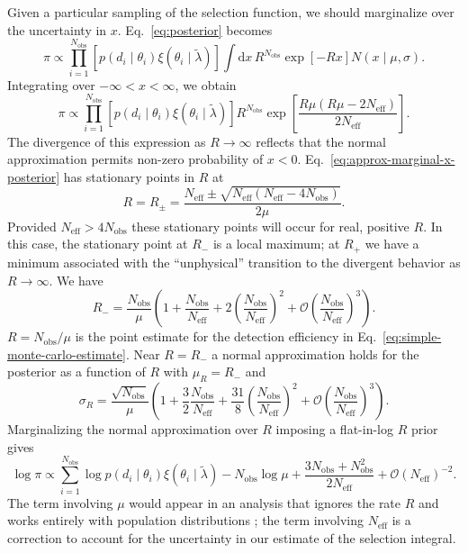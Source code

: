 \documentclass[modern]{aastex62}
\newcommand{\dd}{\mathrm{d}}
\newcommand{\Neff}{N_\mathrm{eff}}
\newcommand{\Nobs}{N_\mathrm{obs}}
\begin{document}
Given a particular sampling of the selection function, we should marginalize
over the uncertainty in $x$.  Eq.\ \eqref{eq:posterior} becomes
%
\begin{equation}
  \label{eq:posterior-integrated}
    \pi \propto \prod_{i = 1}^{\Nobs} \left[ p\left( d_i \mid \theta_i \right) \xi\left( \theta_i \mid \tilde{\lambda} \right) \right] \int \dd x \, R^{\Nobs} \exp\left[ -R x \right] N\left( x \mid \mu, \sigma\right).
\end{equation}
%
Integrating over $-\infty < x < \infty$, we obtain
%
\begin{equation}
  \label{eq:approx-marginal-x-posterior}
  \pi \propto \prod_{i = 1}^{\Nobs} \left[ p\left( d_i \mid \theta_i \right) \xi\left( \theta_i \mid \tilde{\lambda} \right) \right] R^{\Nobs} \exp\left[  \frac{R \mu \left( R\mu - 2 \Neff \right)}{2 \Neff} \right].
\end{equation}
%
The divergence of this expression as $R\to \infty$ reflects that the normal
approximation permits non-zero probability of $x < 0$. Eq.\
\eqref{eq:approx-marginal-x-posterior} has stationary points in $R$ at
%
\begin{equation}
  R = R_{\pm} = \frac{\Neff \pm \sqrt{\Neff \left( \Neff - 4 \Nobs \right)}}{2 \mu}.
\end{equation}
%
Provided $\Neff > 4 \Nobs$ these stationary points will occur for real, positive
$R$.  In this case, the stationary point at $R_{-}$ is a local maximum; at
$R_{+}$ we have a minimum associated with the ``unphysical'' transition to the
divergent behavior as $R\to \infty$.  We have
%
\begin{equation}
  R_{-} = \frac{\Nobs}{\mu} \left( 1 + \frac{\Nobs}{\Neff} + 2 \left( \frac{\Nobs}{\Neff} \right)^2 + \mathcal{O}\left( \frac{\Nobs}{\Neff} \right)^3 \right).
\end{equation}
%
$R = \Nobs / \mu$ is the point estimate for the detection efficiency in Eq.\
\eqref{eq:simple-monte-carlo-estimate}.  Near $R = R_{-}$ a normal approximation
holds for the posterior as a function of $R$ with $\mu_R = R_{-}$ and
%
\begin{equation}
  \sigma_R = \frac{\sqrt{\Nobs}}{\mu} \left( 1 + \frac{3}{2} \frac{\Nobs}{\Neff} + \frac{31}{8} \left( \frac{\Nobs}{\Neff} \right)^2 + \mathcal{O} \left( \frac{\Nobs}{\Neff} \right)^3 \right).
\end{equation}
%
Marginalizing the normal approximation over $R$ imposing a flat-in-log $R$ prior
gives
%
\begin{equation}
  \label{eq:fully-marginalized-posterior}
  \log \pi \propto \sum_{i=1}^{\Nobs} \log p\left( d_i \mid \theta_i \right) \xi\left( \theta_i \mid \tilde{\lambda} \right) - \Nobs \log \mu + \frac{3 \Nobs + \Nobs^2}{2 \Neff} + \mathcal{O} \left( \Neff \right)^{-2}.
\end{equation}
%
The term involving $\mu$ would appear in an analysis that ignores the rate $R$
and works entirely with population distributions
\citep{Mandel2018,Fishbach2018}; the term involving $\Neff$ is a correction to
account for the uncertainty in our estimate of the selection integral.
\end{document}
